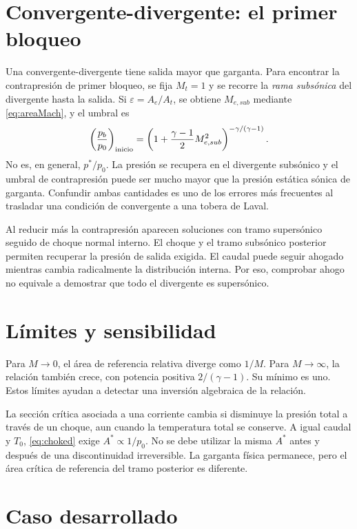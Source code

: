 \section{Convergente-divergente: el primer bloqueo}
Una convergente-divergente tiene salida mayor que garganta. Para encontrar la contrapresión de primer bloqueo, se fija $M_t=1$ y se recorre la \emph{rama subsónica} del divergente hasta la salida. Si $\varepsilon=A_e/A_t$, se obtiene $M_{e,sub}$ mediante \eqref{eq:areaMach}, y el umbral es
\begin{equation}\label{eq:firstchoking}
 \left(\frac{p_b}{p_0}\right)_{\rm inicio}=
 \left(1+\frac{\gamma-1}{2}M_{e,sub}^2\right)^{-\gamma/(\gamma-1)}.
\end{equation}
No es, en general, $p^*/p_0$. La presión se recupera en el divergente subsónico y el umbral de contrapresión puede ser mucho mayor que la presión estática sónica de garganta. Confundir ambas cantidades es uno de los errores más frecuentes al trasladar una condición de convergente a una tobera de Laval.

Al reducir más la contrapresión aparecen soluciones con tramo supersónico seguido de choque normal interno. El choque y el tramo subsónico posterior permiten recuperar la presión de salida exigida. El caudal puede seguir ahogado mientras cambia radicalmente la distribución interna. Por eso, comprobar ahogo no equivale a demostrar que todo el divergente es supersónico.
\section{Límites y sensibilidad}
Para $M\to0$, el área de referencia relativa diverge como $1/M$. Para $M\to\infty$, la relación también crece, con potencia positiva $2/(\gamma-1)$. Su mínimo es uno. Estos límites ayudan a detectar una inversión algebraica de la relación.

La sección crítica asociada a una corriente cambia si disminuye la presión total a través de un choque, aun cuando la temperatura total se conserve. A igual caudal y $T_0$, \eqref{eq:choked} exige $A^*\propto1/p_0$. No se debe utilizar la misma $A^*$ antes y después de una discontinuidad irreversible. La garganta física permanece, pero el área crítica de referencia del tramo posterior es diferente.\cite{MIT03}
\section{Caso desarrollado}

